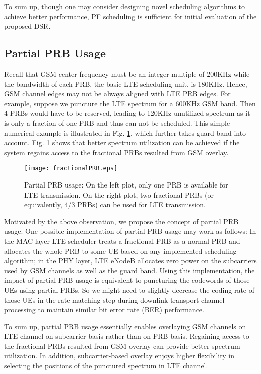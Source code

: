 \documentclass[10pt,journal]{IEEEtran}
\theoremstyle{slplain}
\begin{document}
To sum up, though one may consider designing novel scheduling algorithms to achieve better performance, PF scheduling is sufficient for initial evaluation of the proposed DSR.



\subsection{Partial PRB Usage}


Recall that GSM center frequency must be an integer multiple of 200KHz while the bandwidth of each PRB, the basic LTE scheduling unit, is 180KHz. Hence, GSM channel edges may not be always aligned with LTE PRB edges. For example, suppose we puncture the LTE spectrum for a 600KHz GSM band. Then 4 PRBs would have to be reserved, leading to 120KHz unutilized spectrum as it is only a fraction of one PRB and thus can not be scheduled. This simple numerical example is illustrated in Fig. \ref{fig:fractionalPRB}, which further takes guard band into account. Fig. \ref{fig:fractionalPRB} shows that better spectrum utilization can be achieved if the system regains access to the fractional PRBs resulted from GSM overlay. 

\begin{figure}
\centering
\texttt{[image: fractionalPRB.eps]}
\caption{Partial PRB usage: On the left plot, only one PRB is available for LTE transmission. On the right plot, two fractional PRBs (or equivalently, 4/3 PRBs) can be used for LTE transmission. }
\label{fig:fractionalPRB}
\end{figure}

Motivated by the above observation, we propose the concept of partial PRB usage. One possible implementation of partial PRB usage may work as follows: In the MAC layer LTE scheduler treats a fractional PRB as a normal PRB and allocates the whole PRB to some UE based on any implemented scheduling algorithm; in the PHY layer, LTE eNodeB allocates zero power on the subcarriers used by GSM channels as well as the guard band. Using this implementation, the impact of partial PRB usage is equivalent to puncturing the codewords of those UEs using partial PRBs. So we might need to slightly decrease the coding rate of those UEs in the rate matching step during downlink transport channel processing to maintain similar bit error rate (BER) performance.



To sum up, partial PRB usage essentially enables overlaying GSM channels on LTE channel on subcarrier basis rather than on PRB basis. Regaining access to the fractional PRBs resulted from GSM overlay can provide better spectrum utilization. In addition,  subcarrier-based overlay enjoys higher flexibility in selecting the positions of the punctured spectrum in LTE channel.
\end{document}
